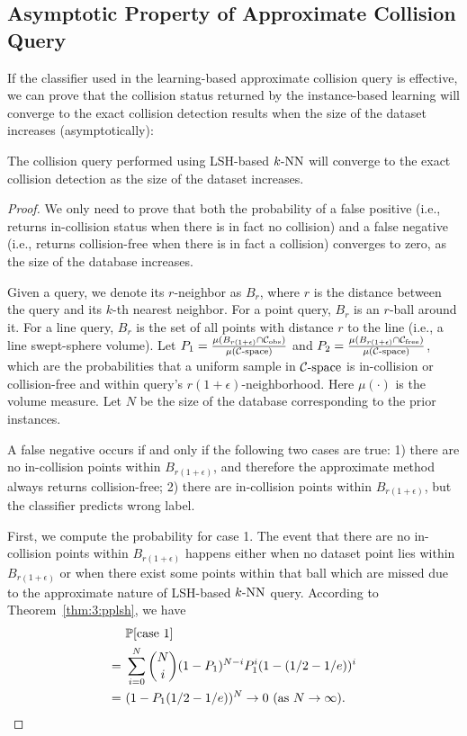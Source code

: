 \subsection{Asymptotic Property of Approximate Collision Query}
\label{subsec:3:knnreasoning:converge}
If the classifier used in the learning-based approximate collision query is effective, we can prove that the collision status returned by the instance-based learning will converge to the exact collision detection results when the size of the dataset increases (asymptotically):
\begin{theorem}
  \label{thm:3:conv}
  The collision query performed using LSH-based $k\text{-NN}$ will converge to the exact collision detection as the size of the dataset increases.
\end{theorem}
\begin{proof}
We only need to prove that both the probability of a false positive (i.e., returns in-collision status when there is in fact no collision) and a false negative (i.e., returns collision-free when there is in fact a collision) converges to zero, as the size of the database increases.

Given a query, we denote its $r$-neighbor as $B_r$, where $r$ is the distance between the query and its $k$-th nearest neighbor. For a point query, $B_r$ is an $r$-ball around it. For a line query, $B_r$ is the set of all points with distance $r$ to the line (i.e., a line swept-sphere volume). Let $P_1 = \frac{\mu(B_{r(1+\epsilon)} \cap \mathcal C_{\text{obs}})}{\mu(\mathcal C\text{-space})}$ and $P_2 = \frac{\mu(B_{r(1+\epsilon)} \cap \mathcal C_{\text{free}})}{\mu(\mathcal C\text{-space})}$, which are the probabilities that a uniform sample in $\mathcal C\text{-space}$ is in-collision or collision-free and within query's $r(1+\epsilon)$-neighborhood. Here $\mu(\cdot)$ is the volume measure. Let $N$ be the size of the database corresponding to the prior instances.

A false negative occurs if and only if the following two cases are true: 1) there are no in-collision points within $B_{r(1+\epsilon)}$, and therefore the approximate method always returns collision-free; 2) there are in-collision points within $B_{r(1+\epsilon)}$, but the classifier predicts wrong label.

First, we compute the probability for case 1. The event that there are no in-collision points within $B_{r(1+\epsilon)}$ happens either when no dataset point lies within $B_{r(1+\epsilon)}$ or when there exist some points within that ball which are missed due to the approximate nature of LSH-based $k\text{-NN}$ query. According to Theorem~\ref{thm:3:pplsh}, we have
\begin{align}
  &\ \mathbb P[\text{case 1}] \notag \\
  =&\ \sum_{i=0}^N \binom{N}{i} (1-P_1)^{N-i} P_1^i (1-(1/2 -1/e))^i \notag \\
  =& \ (1-P_1(1/2-1/e))^N \rightarrow 0 \ (\text{as } N \rightarrow \infty). \notag
\end{align}


\end{proof}
